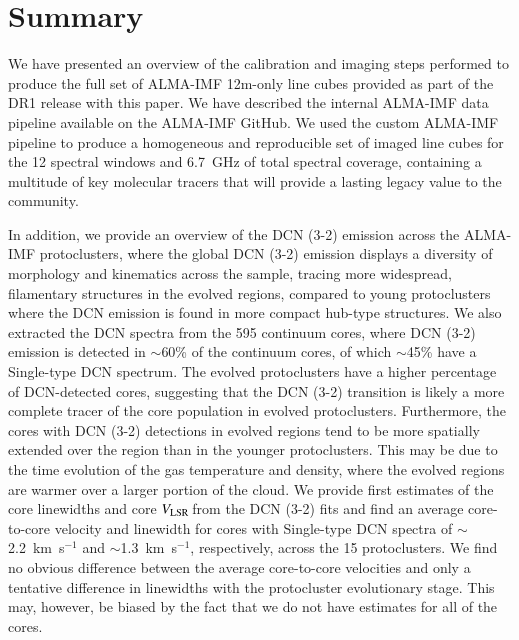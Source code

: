 \documentclass[longauth]{aa} %
\newcommand{\vlsr}{\mbox{$V_{\rm LSR}$\,}}
\newcommand{\kms}{\textrm{km~s}\ensuremath{^{-1}}\xspace}       %
\begin{document}
\section{Summary}

We have presented an overview of the calibration and imaging steps performed to produce the full set of ALMA-IMF 12m-only line cubes provided as part of the DR1 release with this paper. We have described the internal ALMA-IMF data pipeline available on the ALMA-IMF GitHub. We used the custom ALMA-IMF pipeline to produce a homogeneous and reproducible set of imaged line cubes for the 12 spectral windows and 6.7~GHz of total spectral coverage, containing a multitude of key molecular tracers that will provide a lasting legacy value to the community.   

In addition, we provide an overview of the DCN (3-2) emission across the ALMA-IMF protoclusters, where the global DCN (3-2) emission displays a diversity of morphology and kinematics across the sample, tracing more widespread, filamentary structures in the evolved regions, compared to young protoclusters where the DCN emission is found in more compact hub-type structures. We also extracted the DCN spectra from the 595 continuum cores, where DCN (3-2) emission is detected in $\sim$60\% of the continuum cores, of which $\sim$45\% have a Single-type DCN spectrum. The evolved protoclusters have a higher percentage of DCN-detected cores, suggesting that the DCN (3-2) transition is likely a more complete tracer of the core population in evolved protoclusters. Furthermore, the cores with DCN (3-2) detections in evolved regions tend to be more spatially extended over the region than in the younger protoclusters. This may be due to the time evolution of the gas temperature and density, where the evolved regions are warmer over a larger portion of the cloud. We provide first estimates of the core linewidths and core \vlsr from the DCN (3-2) fits and find an average core-to-core velocity and linewidth for cores with Single-type DCN spectra of $\sim$2.2~\kms and $\sim$1.3~\kms, respectively, across the 15 protoclusters. We find no obvious difference between the average core-to-core velocities and only a tentative difference in linewidths with the protocluster evolutionary stage. This may, however, be biased by the fact that we do not have estimates for all of the cores.




\end{document}
